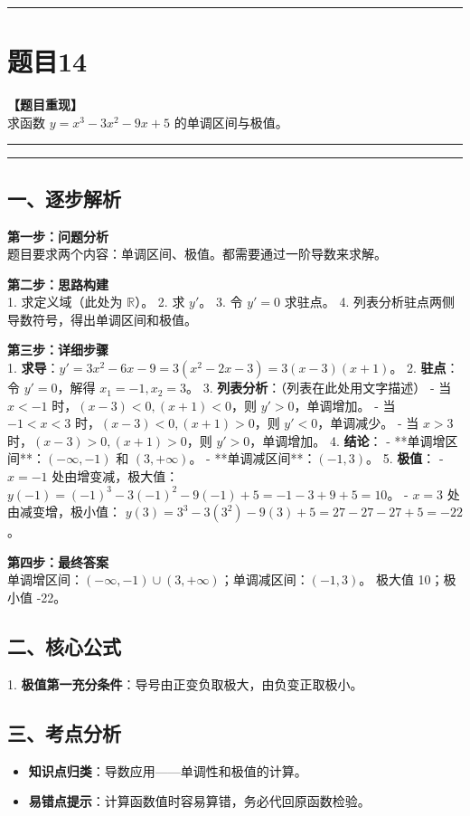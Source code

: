 \documentclass[12pt, a4paper]{ctexart}
\newcommand{\TopSeparator}{
    \par\noindent\rule{\textwidth}{1.5pt}\vspace{0.5em} %
}
\newcommand{\AnalysisSeparator}{
    \par\noindent\rule{\textwidth}{0.5pt}\vspace{0.2em}\hrule\vspace{0.5em} %
}
\newenvironment{RedAnalysis}{
    \par
    \color{red} %
}{
    \par
    \color{black} %
}
\begin{document}
\vspace{2em}

\TopSeparator
\section*{题目14}

\textbf{【题目重现】} \\
求函数 $ y = x^{3} - 3x^{2} - 9x + 5 $ 的单调区间与极值。

\AnalysisSeparator

\begin{RedAnalysis}

\subsection*{一、逐步解析}

\textbf{第一步：问题分析} \\
题目要求两个内容：单调区间、极值。都需要通过一阶导数来求解。

\textbf{第二步：思路构建} \\
1. 求定义域（此处为 $\mathbb{R}$）。
2. 求 $y'$。
3. 令 $y'=0$ 求驻点。
4. 列表分析驻点两侧导数符号，得出单调区间和极值。

\textbf{第三步：详细步骤} \\
1. \textbf{求导}：$y' = 3x^2 - 6x - 9 = 3(x^2 - 2x - 3) = 3(x-3)(x+1)$。
2. \textbf{驻点}：令 $y'=0$，解得 $x_1 = -1, x_2 = 3$。
3. \textbf{列表分析}：（列表在此处用文字描述）
   - 当 $x < -1$ 时，$(x-3)<0, (x+1)<0$，则 $y' > 0$，单调增加。
   - 当 $-1 < x < 3$ 时，$(x-3)<0, (x+1)>0$，则 $y' < 0$，单调减少。
   - 当 $x > 3$ 时，$(x-3)>0, (x+1)>0$，则 $y' > 0$，单调增加。
4. \textbf{结论}：
   - **单调增区间**：$(-\infty, -1)$ 和 $(3, +\infty)$。
   - **单调减区间**：$(-1, 3)$。
5. \textbf{极值}：
   - $x = -1$ 处由增变减，极大值：
     $y(-1) = (-1)^3 - 3(-1)^2 - 9(-1) + 5 = -1 - 3 + 9 + 5 = 10$。
   - $x = 3$ 处由减变增，极小值：
     $y(3) = 3^3 - 3(3^2) - 9(3) + 5 = 27 - 27 - 27 + 5 = -22$。

\textbf{第四步：最终答案} \\
单调增区间：$(-\infty, -1) \cup (3, +\infty)$；单调减区间：$(-1, 3)$。
极大值 10；极小值 -22。

\subsection*{二、核心公式}
1. \textbf{极值第一充分条件}：导号由正变负取极大，由负变正取极小。

\subsection*{三、考点分析}
\begin{itemize}
    \item \textbf{知识点归类}：导数应用——单调性和极值的计算。
    \item \textbf{易错点提示}：计算函数值时容易算错，务必代回原函数检验。
\end{itemize}

\end{RedAnalysis}
\end{document}

